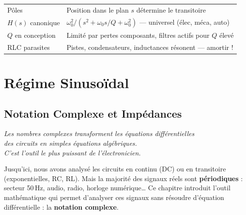 \documentclass[12pt,a4paper,twoside]{book}
\begin{document}
\begin{ingenieur}[title={\color{white} Résumé --- Niveau Ingénieur}]
\begin{center}
\renewcommand{\arraystretch}{1.3}
\begin{tabular}{p{4cm}p{9cm}}
\toprule
Pôles & Position dans le plan $s$ détermine le transitoire \\
$H(s)$ canonique & $\omega_0^2/(s^2 + \omega_0 s/Q + \omega_0^2)$ --- universel (élec, méca, auto) \\
$Q$ en conception & Limité par pertes composants, filtres actifs pour $Q$ élevé \\
RLC parasites & Pistes, condensateurs, inductances résonent --- amortir ! \\
\bottomrule
\end{tabular}
\end{center}
\end{ingenieur}


\part{Régime Sinusoïdal}

\chapter{Notation Complexe et Impédances}

\begin{center}
\textit{Les nombres complexes transforment les équations différentielles\\
des circuits en simples équations algébriques.\\
C'est l'outil le plus puissant de l'électronicien.}
\end{center}

\vspace{0.5cm}

Jusqu'ici, nous avons analysé les circuits en continu (DC) ou en transitoire (exponentielles, RC, RL). Mais la majorité des signaux réels sont \textbf{périodiques} : secteur 50\,Hz, audio, radio, horloge numérique\ldots{} Ce chapitre introduit l'outil mathématique qui permet d'analyser ces signaux sans résoudre d'équation différentielle : la \textbf{notation complexe}.
\end{document}
